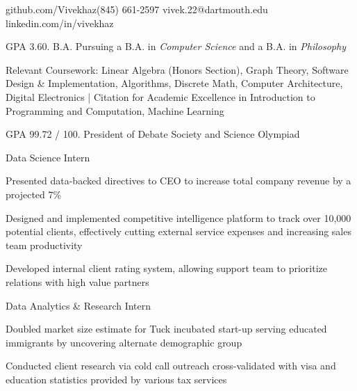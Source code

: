 \documentclass{vivek-resume}
\begin{document}
\namehead

\address{ vivek.fm}{github.com/Vivekhaz}{(845) 661-2597}{ vivek.22@dartmouth.edu }{linkedin.com/in/vivekhaz}{}


	\begin{position}{}{}
		\item GPA 3.60. B.A. Pursuing a B.A. in \textit{Computer Science} and a B.A. in \textit{Philosophy}
		\item Relevant Coursework: Linear Algebra (Honors Section), Graph Theory, Software Design \& Implementation, Algorithms, Discrete Math, Computer Architecture, Digital Electronics | Citation for Academic Excellence in Introduction to Programming and Computation, Machine Learning
	\end{position}

	\begin{position}{}{}
	\item GPA 99.72 / 100. President of Debate Society and Science Olympiad
	\end{position}


	\begin{position}{Data Science Intern}{}
		\item Presented data-backed directives to CEO to increase total company revenue by a projected 7\%
		\item Designed and implemented competitive intelligence platform to track over 10,000 potential clients, effectively cutting external service expenses and increasing sales team productivity
		\item Developed internal client rating system, allowing support team to prioritize relations with high value partners
		
	\end{position}
	
	\begin{position}{Data Analytics \& Research Intern}{}
		\item Doubled market size estimate for Tuck incubated start-up serving educated immigrants by uncovering alternate demographic group 
		\item Conducted client research via cold call outreach cross-validated with visa and education statistics provided by various tax services
	\end{position}
	
\end{document}
